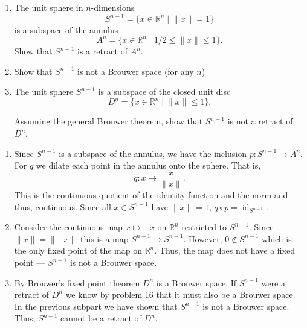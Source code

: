 \documentclass[12 pt, letterpaper]{hmcpset}
\begin{document}
\pagebreak

\begin{problem}[17.]
	\begin{enumerate}
		\item The unit sphere in $n$-dimensions
			\[
				S^{n - 1} = \{ x \in \mathbb{R}^{n} \mid \lVert x \rVert = 1 \}
			\]
			is a subspace of the annulus
			\[
				A^{n} = \{ x \in \mathbb{R}^{n} \mid 1/2 \le \lVert x \rVert \le 1 \}.
			\]
			Show that $S^{n - 1}$ is a retract of $A^{n}$.
		\item Show that $S^{n - 1}$ is not a Brouwer space (for any $n$)
		\item The unit sphere $S^{n - 1}$ is a subspace of the closed unit disc
			\[
				D^{n} = \{ x \in \mathbb{R}^{n} \mid \lVert x \rVert \le 1 \}.
			\]

			Assuming the general Brouwer theorem, show that $S^{n - 1}$ is not a retract of $D^{n}$.
	\end{enumerate}
\end{problem}

\begin{solution}
	\begin{enumerate}
		\item Since $S^{n - 1}$ is a subspace of the annulus, we have the inclusion $p : S^{n - 1} \to A^{n}$. For $q$ we dilate each point in the annulus onto the sphere. That is,
			\[
				q : x \mapsto \frac{x}{\lVert x \rVert}.
			\]
			This is the continuous quotient of the identity function and the norm and thus, continuous. Since all $x \in S^{n - 1}$ have $\lVert x \rVert = 1$,  $q \circ p = \operatorname{id}_{S^{n - 1}}$.

		\item Consider the continuous map $x \mapsto -x$ on $\mathbb{R}^{n}$ restricted to $S^{n - 1}$. Since $\lVert x \rVert = \lVert -x \rVert$ this is a map $S^{n - 1} \to S^{n - 1}$. However, $0 \notin S^{n - 1}$ which is the only fixed point of the map on $\mathbb{R}^{n}$. Thus, the map does not have a fixed point --- $S^{n - 1}$ is not a Brouwer space.

		\item By Brouwer's fixed point theorem $D^{n}$ is a Brouwer space. If $S^{n - 1}$ were a retract of $D^{n}$ we know by problem 16 that it must also be a Brouwer space. In the previous subpart we have shown that $S^{n - 1}$ is not a Brouwer space. Thus, $S^{n - 1}$ cannot be a retract of $D^{n}$.
	\end{enumerate}
\end{solution}
\end{document}
